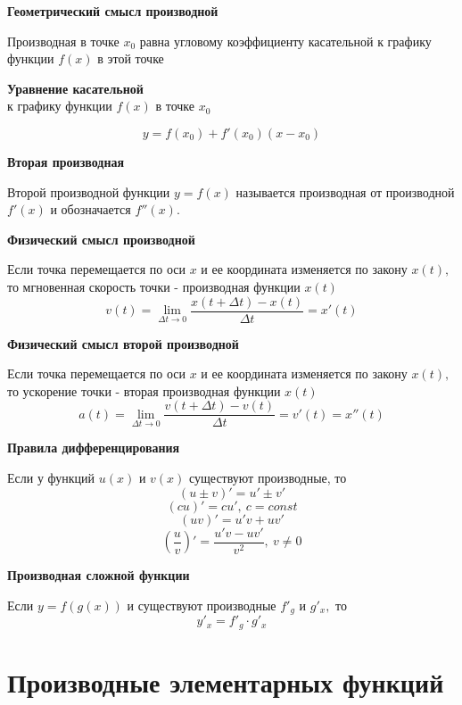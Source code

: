 \documentclass[a5paper, 8pt]{extarticle}
\begin{document}
\begin{center}
\textbf{Геометрический смысл производной}
\end{center}
Производная в точке $x_0$ равна угловому коэффициенту касательной
к графику функции $f(x)$ в этой точке

\begin{center}
\textbf{Уравнение касательной}\\
к графику функции $f(x)$ в точке $x_0$
\end{center}
$$y=f(x_0)+f'(x_0)(x-x_0)$$

\begin{center}
\textbf{Вторая производная}
\end{center}

Второй производной функции $y=f(x)$ называется производная от производной $f'(x)$  и обозначается $f''(x).$

\begin{center}
\textbf{Физический смысл производной}
\end{center}
Если точка перемещается по оси $x$ и ее координата изменяется по закону $x(t),$ то мгновенная скорость точки - производная функции $x(t)$ 
$$
v(t)=\lim\limits_{\Delta t\to 0}\frac{x(t+\Delta t)-x(t)}{\Delta t}=x'(t)
$$

\begin{center}
\textbf{Физический смысл второй производной}
\end{center}
Если точка перемещается по оси $x$ и ее координата изменяется по закону $x(t),$ то ускорение точки - вторая производная функции $x(t)$ 
$$
a(t)=\lim\limits_{\Delta t\to 0}\frac{v(t+\Delta t)-v(t)}{\Delta t}=v'(t)=x''(t)
$$

\begin{center}
\textbf{Правила дифференцирования}
\end{center}

Если у функций $u(x)$ и $v(x)$ существуют производные, то
$$
(u\pm v)'=u'\pm v'
$$
$$
(cu)'=cu', \ c=const
$$
$$
(uv)'=u'v+uv'
$$
$$
\left(\frac{u}{v}\right)'=\frac{u'v-uv'}{v^2},\ v\not= 0
$$

\begin{center}
\textbf{Производная сложной функции}
\end{center}

Если $y=f(g(x))$ и существуют производные $f'_g$ и $g'_x,$ то
$$y'_x=f'_g\cdot g'_x$$

\section{Производные элементарных функций}
\end{document}
